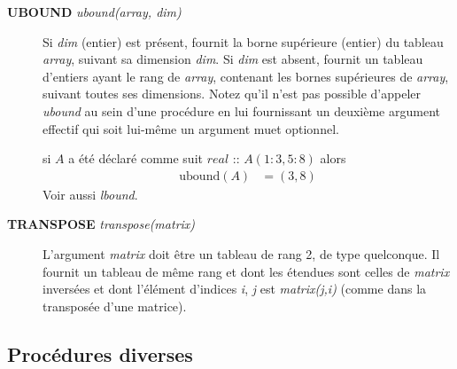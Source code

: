 \documentclass[a4paper,twoside]{article}
\begin{document}
\begin{description}
\item[\textbf{UBOUND} \emph{ubound(array, dim)}] Si \emph{dim} (entier) est présent, fournit la borne supérieure (entier) du tableau \emph{array}, suivant sa dimension \emph{dim}. Si \emph{dim} est absent, fournit un tableau d'entiers ayant le rang de \emph{array}, contenant les bornes supérieures de \emph{array}, suivant toutes ses dimensions. Notez qu'il n'est pas possible d'appeler \emph{ubound} au sein d'une procédure en lui fournissant un deuxième argument effectif qui soit lui-même un argument muet optionnel. 
\begin{exemple}
si $A$ a été déclaré comme suit 
$real$ :: $A(1:3,5:8)$ alors
\begin{align}
\mathrm{ubound}(A)  &= (3,8)
\end{align}
Voir 
aussi \emph{lbound}.
\end{exemple}

\item[\textbf{TRANSPOSE} \emph{transpose(matrix)}] L'argument \emph{matrix}  doit être un tableau de rang 2, de type quel\-con\-que. Il fournit un tableau de même rang et dont les étendues sont celles de \emph{matrix} inversées et dont l'élément d'indices \emph{i}, \emph{j} est \emph{matrix(j,i)} (comme dans la transposée d'une matrice).
\end{description}

\subsection{Procédures diverses}
\end{document}
